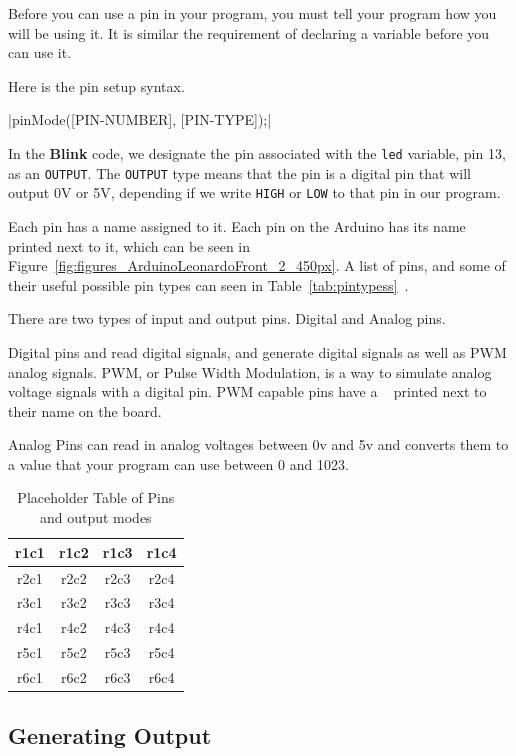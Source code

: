 \documentclass[11pt,a4paper]{article}
\begin{document}
Before you can use a pin in your program, you must tell your program how you will be using it.  It is similar the requirement of declaring a variable before you can use it.  

Here is the pin setup syntax.

|pinMode([PIN-NUMBER], [PIN-TYPE]);|

In the \textbf{Blink} code, we designate the pin associated with the \texttt{led} variable, pin 13, as an \texttt{OUTPUT}.  The \texttt{OUTPUT} type means that the pin is a digital pin that will output 0V or 5V, depending if we write \texttt{HIGH} or \texttt{LOW} to that pin in our program.

Each pin has a name assigned to it.  Each pin on the Arduino has its name printed next to it, which can be seen in Figure~\ref{fig:figures_ArduinoLeonardoFront_2_450px}.  A list of pins, and some of their useful possible pin types can seen in Table~\ref{tab:pintypess}~.

There are two types of input and output pins.  Digital and Analog pins.

Digital pins and read digital signals, and generate digital signals as well as PWM analog signals.  PWM, or Pulse Width Modulation, is a way to simulate analog voltage signals with a digital pin.  PWM capable pins have a ~ printed next to their name on the board.

Analog Pins can read in analog voltages between 0v and 5v and converts them to a value that your program can use between 0 and 1023.

\begin{table}[hct!]
\caption{Placeholder Table of Pins and output modes}
\label{tab:pintypes}
\centering
\begin{tabular}{cc|cc}
\hline \hline 
r1c1 & r1c2 & r1c3 & r1c4\\
\hline
r2c1 & r2c2 & r2c3 & r2c4\\
\hline
r3c1 & r3c2 & r3c3 & r3c4\\
\hline
r4c1 & r4c2 & r4c3 & r4c4\\
\hline
r5c1 & r5c2 & r5c3 & r5c4\\
\hline
r6c1 & r6c2 & r6c3 & r6c4\\
\hline \hline 
\end{tabular}
\end{table}


\subsection{Generating Output} %
\label{sub:generating_output}
\end{document}
